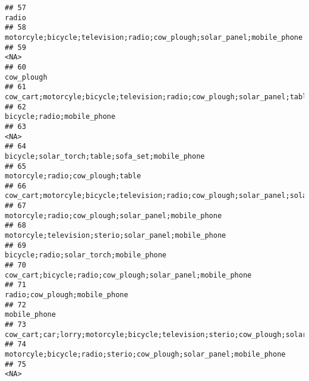 \documentclass[
]{article}
\begin{document}
\begin{verbatim}
## 57                                                                                                                                     radio
## 58                                                                    motorcyle;bicycle;television;radio;cow_plough;solar_panel;mobile_phone
## 59                                                                                                                                      <NA>
## 60                                                                                                                                cow_plough
## 61                                                     cow_cart;motorcyle;bicycle;television;radio;cow_plough;solar_panel;table;mobile_phone
## 62                                                                                                                bicycle;radio;mobile_phone
## 63                                                                                                                                      <NA>
## 64                                                                                           bicycle;solar_torch;table;sofa_set;mobile_phone
## 65                                                                                                          motorcyle;radio;cow_plough;table
## 66                                               cow_cart;motorcyle;bicycle;television;radio;cow_plough;solar_panel;solar_torch;mobile_phone
## 67                                                                                       motorcyle;radio;cow_plough;solar_panel;mobile_phone
## 68                                                                                      motorcyle;television;sterio;solar_panel;mobile_phone
## 69                                                                                                    bicycle;radio;solar_torch;mobile_phone
## 70                                                                                cow_cart;bicycle;radio;cow_plough;solar_panel;mobile_phone
## 71                                                                                                             radio;cow_plough;mobile_phone
## 72                                                                                                                              mobile_phone
## 73  cow_cart;car;lorry;motorcyle;bicycle;television;sterio;cow_plough;solar_panel;solar_torch;electricity;table;sofa_set;mobile_phone;fridge
## 74                                                                        motorcyle;bicycle;radio;sterio;cow_plough;solar_panel;mobile_phone
## 75                                                                                                                                      <NA>

\end{verbatim}
\end{document}
